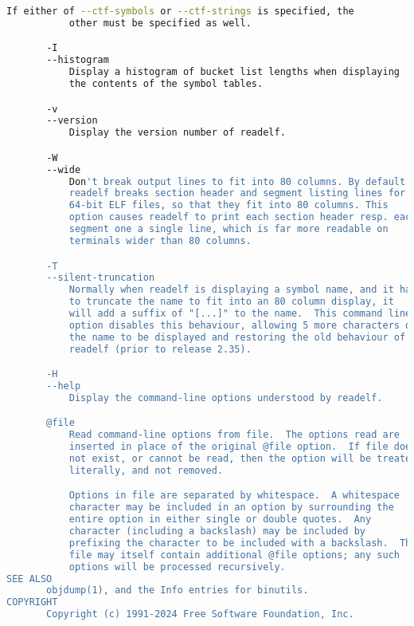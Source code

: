 {{\begin{lstlisting}[language=bash]
           If either of --ctf-symbols or --ctf-strings is specified, the
           other must be specified as well.

       -I
       --histogram
           Display a histogram of bucket list lengths when displaying
           the contents of the symbol tables.

       -v
       --version
           Display the version number of readelf.

       -W
       --wide
           Don't break output lines to fit into 80 columns. By default
           readelf breaks section header and segment listing lines for
           64-bit ELF files, so that they fit into 80 columns. This
           option causes readelf to print each section header resp. each
           segment one a single line, which is far more readable on
           terminals wider than 80 columns.

       -T
       --silent-truncation
           Normally when readelf is displaying a symbol name, and it has
           to truncate the name to fit into an 80 column display, it
           will add a suffix of "[...]" to the name.  This command line
           option disables this behaviour, allowing 5 more characters of
           the name to be displayed and restoring the old behaviour of
           readelf (prior to release 2.35).

       -H
       --help
           Display the command-line options understood by readelf.

       @file
           Read command-line options from file.  The options read are
           inserted in place of the original @file option.  If file does
           not exist, or cannot be read, then the option will be treated
           literally, and not removed.

           Options in file are separated by whitespace.  A whitespace
           character may be included in an option by surrounding the
           entire option in either single or double quotes.  Any
           character (including a backslash) may be included by
           prefixing the character to be included with a backslash.  The
           file may itself contain additional @file options; any such
           options will be processed recursively.
SEE ALSO
       objdump(1), and the Info entries for binutils.
COPYRIGHT
       Copyright (c) 1991-2024 Free Software Foundation, Inc.


\end{lstlisting}}}
